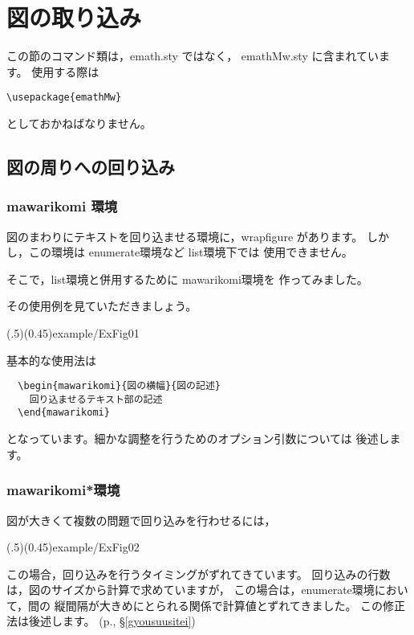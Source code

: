 \documentclass[fleqn,a4j]{jarticle}
\begin{document}
\pagebreak

\section{図の取り込み}
この節のコマンド類は，emath.sty ではなく，
emathMw.sty に含まれています。
使用する際は
\begin{jquote}
\begin{verbatim}
\usepackage{emathMw}
\end{verbatim}
\end{jquote}
としておかねばなりません。

\subsection{図の周りへの回り込み}
\subsubsection{\textsf{mawarikomi} 環境}
図のまわりにテキストを回り込ませる環境に，wrapfigure があります。
しかし，この環境は \textsf{enumerate}環境など \textsf{list}環境下では
使用できません。

そこで，\textsf{list}環境と併用するために \textsf{mawarikomi}環境を
作ってみました。

その使用例を見ていただきましょう。

(.5)(0.45){example/ExFig01}

基本的な使用法は
\begin{verbatim}
  \begin{mawarikomi}{図の横幅}{図の記述}
    回り込ませるテキスト部の記述
  \end{mawarikomi}
\end{verbatim}

\noindent
となっています。細かな調整を行うためのオプション引数については
後述します。

\subsubsection{\textsf{mawarikomi*}環境}\label{S-hukusuumon}
図が大きくて複数の問題で回り込みを行わせるには，

\showexample[複数の問題で回り込み](.5)(0.45){example/ExFig02}
\label{hukusuumon}

この場合，回り込みを行うタイミングがずれてきています。
回り込みの行数は，図のサイズから計算で求めていますが，
この場合は，\textsf{enumerate}環境において，間の
縦間隔が大きめにとられる関係で計算値とずれてきました。
この修正法は後述します。
(p.\pageref{gyousuusitei}, §\ref{gyousuusitei})
\end{document}
